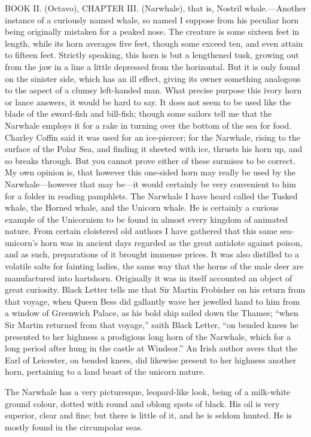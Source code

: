 BOOK II. (Octavo), CHAPTER III. (Narwhale), that is, Nostril whale.—Another instance of a curiously named whale, so named I suppose from his peculiar horn being originally mistaken for a peaked nose. The creature is some sixteen feet in length, while its horn averages five feet, though some exceed ten, and even attain to fifteen feet. Strictly speaking, this horn is but a lengthened tusk, growing out from the jaw in a line a little depressed from the horizontal. But it is only found on the sinister side, which has an ill effect, giving its owner something analogous to the aspect of a clumsy left-handed man. What precise purpose this ivory horn or lance answers, it would be hard to say. It does not seem to be used like the blade of the sword-fish and bill-fish; though some sailors tell me that the Narwhale employs it for a rake in turning over the bottom of the sea for food. Charley Coffin said it was used for an ice-piercer; for the Narwhale, rising to the surface of the Polar Sea, and finding it sheeted with ice, thrusts his horn up, and so breaks through. But you cannot prove either of these surmises to be correct. My own opinion is, that however this one-sided horn may really be used by the Narwhale—however that may be—it would certainly be very convenient to him for a folder in reading pamphlets. The Narwhale I have heard called the Tusked whale, the Horned whale, and the Unicorn whale. He is certainly a curious example of the Unicornism to be found in almost every kingdom of animated nature. From certain cloistered old authors I have gathered that this same sea-unicorn’s horn was in ancient days regarded as the great antidote against poison, and as such, preparations of it brought immense prices. It was also distilled to a volatile salts for fainting ladies, the same way that the horns of the male deer are manufactured into hartshorn. Originally it was in itself accounted an object of great curiosity. Black Letter tells me that Sir Martin Frobisher on his return from that voyage, when Queen Bess did gallantly wave her jewelled hand to him from a window of Greenwich Palace, as his bold ship sailed down the Thames; “when Sir Martin returned from that voyage,” saith Black Letter, “on bended knees he presented to her highness a prodigious long horn of the Narwhale, which for a long period after hung in the castle at Windsor.” An Irish author avers that the Earl of Leicester, on bended knees, did likewise present to her highness another horn, pertaining to a land beast of the unicorn nature.

The Narwhale has a very picturesque, leopard-like look, being of a milk-white ground colour, dotted with round and oblong spots of black. His oil is very superior, clear and fine; but there is little of it, and he is seldom hunted. He is mostly found in the circumpolar seas.


